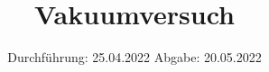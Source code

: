 

\subject{V70}
\title{Vakuumversuch}
\date{%
  Durchführung: 25.04.2022
  \hspace{3em}
  Abgabe: 20.05.2022
}



\maketitle
\thispagestyle{empty}
\tableofcontents
\newpage






\printbibliography{}




